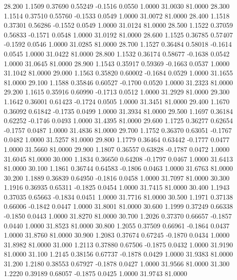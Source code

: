   28.200   1.1509   0.37690   0.55249  -0.1516   0.0550   1.0000  31.0030  81.0000
  28.300   1.1514   0.37510   0.55760  -0.1533   0.0549   1.0000  31.0072  81.0000
  28.400   1.1518   0.37301   0.56286  -0.1552   0.0549   1.0000  31.0124  81.0000
  28.500   1.1522   0.37059   0.56833  -0.1571   0.0548   1.0000  31.0192  81.0000
  28.600   1.1525   0.36785   0.57407  -0.1592   0.0546   1.0000  31.0285  81.0000
  28.700   1.1527   0.36484   0.58018  -0.1614   0.0545   1.0000  31.0422  81.0000
  28.800   1.1532   0.36174   0.58677  -0.1638   0.0542   1.0000  31.0645  81.0000
  28.900   1.1543   0.35917   0.59369  -0.1663   0.0537   1.0000  31.1042  81.0000
  29.000   1.1563   0.35820   0.60002  -0.1684   0.0529   1.0000  31.1655  81.0000
  29.100   1.1588   0.35846   0.60527  -0.1700   0.0520   1.0000  31.2323  81.0000
  29.200   1.1615   0.35916   0.60990  -0.1713   0.0512   1.0000  31.2929  81.0000
  29.300   1.1642   0.36001   0.61423  -0.1724   0.0505   1.0000  31.3451  81.0000
  29.400   1.1670   0.36092   0.61842  -0.1735   0.0499   1.0000  31.3934  81.0000
  29.500   1.1697   0.36184   0.62252  -0.1746   0.0493   1.0000  31.4395  81.0000
  29.600   1.1725   0.36277   0.62654  -0.1757   0.0487   1.0000  31.4836  81.0000
  29.700   1.1752   0.36370   0.63051  -0.1767   0.0482   1.0000  31.5257  81.0000
  29.800   1.1779   0.36464   0.63442  -0.1777   0.0477   1.0000  31.5660  81.0000
  29.900   1.1807   0.36557   0.63828  -0.1787   0.0472   1.0000  31.6045  81.0000
  30.000   1.1834   0.36650   0.64208  -0.1797   0.0467   1.0000  31.6413  81.0000
  30.100   1.1861   0.36744   0.64583  -0.1806   0.0463   1.0000  31.6763  81.0000
  30.200   1.1889   0.36839   0.64950  -0.1816   0.0458   1.0000  31.7097  81.0000
  30.300   1.1916   0.36935   0.65311  -0.1825   0.0454   1.0000  31.7415  81.0000
  30.400   1.1943   0.37035   0.65663  -0.1834   0.0451   1.0000  31.7716  81.0000
  30.500   1.1971   0.37138   0.66006  -0.1842   0.0447   1.0000  31.8001  81.0000
  30.600   1.1999   0.37249   0.66338  -0.1850   0.0443   1.0000  31.8270  81.0000
  30.700   1.2026   0.37370   0.66657  -0.1857   0.0440   1.0000  31.8523  81.0000
  30.800   1.2055   0.37509   0.66961  -0.1864   0.0437   1.0000  31.8760  81.0000
  30.900   1.2083   0.37674   0.67245  -0.1870   0.0434   1.0000  31.8982  81.0000
  31.000   1.2113   0.37880   0.67506  -0.1875   0.0432   1.0000  31.9190  81.0000
  31.100   1.2145   0.38156   0.67737  -0.1878   0.0429   1.0000  31.9383  81.0000
  31.200   1.2180   0.38553   0.67927  -0.1878   0.0427   1.0000  31.9566  81.0000
  31.300   1.2220   0.39189   0.68057  -0.1875   0.0425   1.0000  31.9743  81.0000
